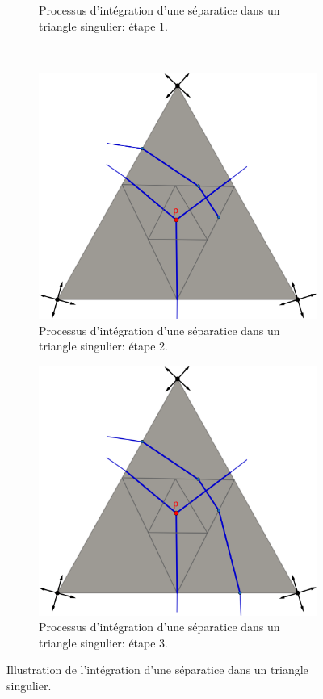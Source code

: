 \begin{figure}[!h]
\begin{subfigure}[b]{0.495\textwidth}
    \caption{Processus d'intégration d'une séparatice dans un triangle singulier: étape 1.}
    \label{fig:draw_streams_sing_2}
\end{subfigure}
\\[0.8cm]
\begin{subfigure}[b]{0.495\textwidth}
    \centering
    \includegraphics[width=\textwidth]{images/draw_streams_sing_3.pdf}
    \caption{Processus d'intégration d'une séparatice dans un triangle singulier: étape 2.}
    \label{fig:draw_streams_sing_3}
\end{subfigure}
\hfill
\begin{subfigure}[b]{0.495\textwidth}
    \centering
    \includegraphics[width=\textwidth]{images/draw_streams_sing_4.pdf}
    \caption{Processus d'intégration d'une séparatice dans un triangle singulier: étape 3.}
    \label{fig:draw_streams_sing_4}
\end{subfigure}
\caption{Illustration de l'intégration d'une séparatice dans un triangle singulier.}
\label{fig:draw_streams_sing}
\end{figure}

